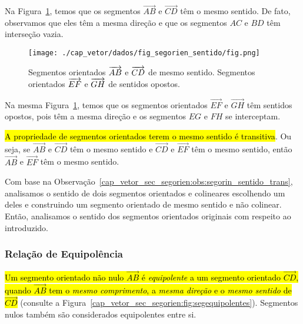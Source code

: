 \begin{ex}
  Na Figura~\ref{cap_vetor_sec_segorien:fig:segorien_sentido}, temos que os segmentos $\overrightarrow{AB}$ e $\overrightarrow{CD}$ têm o mesmo sentido. De fato, observamos que eles têm a mesma direção e que os segmentos $AC$ e $BD$ têm interseção vazia.

\begin{figure}[h]
  \centering
  \texttt{[image: ./cap\_vetor/dados/fig\_segorien\_sentido/fig.png]}
  \caption{Segmentos orientados $\protect\overrightarrow{AB}$ e $\protect\overrightarrow{CD}$ de mesmo sentido. Segmentos orientados $\protect\overrightarrow{EF}$ e $\protect\overrightarrow{GH}$ de sentidos opostos.}
  \label{cap_vetor_sec_segorien:fig:segorien_sentido}
\end{figure}

Na mesma Figura~\ref{cap_vetor_sec_segorien:fig:segorien_sentido}, temos que os segmentos orientados $\overrightarrow{EF}$ e $\overrightarrow{GH}$ têm sentidos opostos, pois têm a mesma direção e os segmentos $EG$ e $FH$ se interceptam. 
\end{ex}

\begin{obs}\label{cap_vetor_sec_segorien:obs:segorin_sentido_trans}
  \hl{A propriedade de segmentos orientados terem o mesmo sentido é transitiva}. Ou seja, se $\overrightarrow{AB}$ e $\overrightarrow{CD}$ têm o mesmo sentido e $\overrightarrow{CD}$ e $\overrightarrow{EF}$ têm o mesmo sentido, então $\overrightarrow{AB}$ e $\overrightarrow{EF}$ têm o mesmo sentido.
\end{obs}

Com base na Observação~\ref{cap_vetor_sec_segorien:obs:segorin_sentido_trans}, analisamos o sentido de dois segmentos orientados e colineares escolhendo um deles e construindo um segmento orientado de mesmo sentido e não colinear. Então, analisamos o sentido dos segmentos orientados originais com respeito ao introduzido.

\subsubsection{Relação de Equipolência}

\hl{Um segmento orientado não nulo $\overrightarrow{AB}$ é \emph{equipolente} a um segmento orientado $\overrightarrow{CD}$, quando $\overrightarrow{AB}$ tem o \emph{mesmo comprimento}, a \emph{mesma direção} e o \emph{mesmo sentido} de $\overrightarrow{CD}$} (consulte a Figura~\ref{cap_vetor_sec_segorien:fig:segequipolentes}). Segmentos nulos também são considerados equipolentes entre si. 


